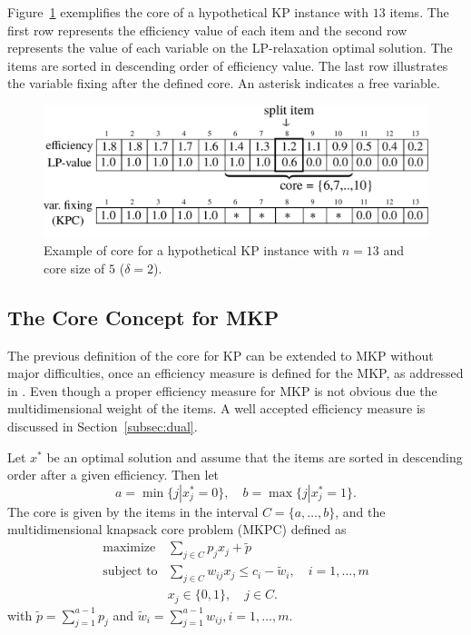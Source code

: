 Figure~\ref{fig:kpcore} exemplifies the core of a hypothetical KP instance with
$13$ items.
The first row represents the efficiency value of each item and the second row
represents the value of each variable on the LP-relaxation optimal solution.
The items are sorted in descending order of efficiency value.
The last row illustrates the variable fixing after the defined core.
An asterisk indicates a free variable.

\begin{figure}[h]
  \centering
  \includegraphics[scale=0.37]{imgs/kp_2}
  \caption{Example of core for a hypothetical KP instance with $n=13$ and core size of $5$ ($\delta = 2$).}
  \label{fig:kpcore}
\end{figure}

\subsection{The Core Concept for MKP}

The previous definition of the core for KP can be extended to MKP without major
difficulties, once an efficiency measure is defined for the MKP,
as addressed in \cite{puchinger2006core}.
Even though a proper efficiency measure for MKP is not obvious due the
multidimensional weight of the items.
A well accepted efficiency measure is discussed in Section~\ref{subsec:dual}.

Let $x^*$ be an optimal solution and assume that the items are sorted in
descending order after a given efficiency. Then let
\begin{displaymath}
  a = \min \{ j | x_j^* = 0 \}, \quad b = \max \{ j | x_j^* = 1 \}.
\end{displaymath}
The core is given by the items in the interval $C = \{ a, \ldots, b \}$,
and the multidimensional knapsack core problem (MKPC) defined as
\begin{align*}
  \text{maximize} & \sum_{j \in C} p_j x_j  + \tilde{p}\\
  \text{subject to} & \sum_{j \in C} w_{ij} x_j \leqslant c_i - \tilde{w}_i, \quad i = 1, \ldots, m\\
  & x_j \in \{0, 1\}, \quad j \in C.
\end{align*}
with $\tilde{p} = \sum^{a-1}_{j=1} p_j$  and $\tilde{w}_i = \sum^{a-1}_{j=1} w_{ij}, i = 1, \ldots, m$.

